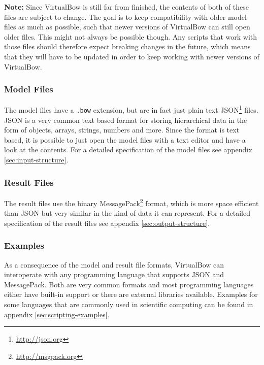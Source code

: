 \documentclass[12pt]{article}
\begin{document}
\textbf{Note:} Since VirtualBow is still far from finished, the contents of both of these files are subject to change.
The goal is to keep compatibility with older model files as much as possible, such that newer versions of VirtualBow can still open older files.
This might not always be possible though.
Any scripts that work with those files should therefore expect breaking changes in the future, which means that they will have to be updated in order to keep working with newer versions of VirtualBow.

\subsubsection*{Model Files}

The model files have a \texttt{.bow} extension, but are in fact just plain text JSON\footnote{\url{http://json.org}} files.
JSON is a very common text based format for storing hierarchical data in the form of objects, arrays, strings, numbers and more.
Since the format is text based, it is possible to just open the model files with a text editor and have a look at the contents.
For a detailed specification of the model files see appendix \ref{sec:input-structure}.

\subsubsection*{Result Files}

The result files use the binary MessagePack\footnote{\url{http://msgpack.org}} format, which is more space efficient than JSON but very similar in the kind of data it can represent. For a detailed specification of the result files see appendix \ref{sec:output-structure}.

\subsubsection*{Examples}

As a consequence of the model and result file formats, VirtualBow can interoperate with any programming language that supports JSON and MessagePack.
Both are very common formats and most programming languages either have built-in support or there are external libraries available.
Examples for some languages that are commonly used in scientific computing can be found in appendix \ref{sec:scripting-examples}.

\bigskip

\appendix
\end{document}
